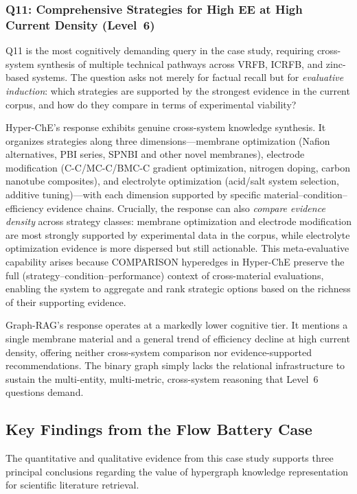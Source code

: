 \documentclass[11pt,a4paper]{article}
\begin{document}
\subsubsection{Q11: Comprehensive Strategies for High EE at High Current Density (Level~6)}

Q11 is the most cognitively demanding query in the case study, requiring cross-system synthesis of multiple technical pathways across VRFB, ICRFB, and zinc-based systems. The question asks not merely for factual recall but for \emph{evaluative induction}: which strategies are supported by the strongest evidence in the current corpus, and how do they compare in terms of experimental viability?

Hyper-ChE's response exhibits genuine cross-system knowledge synthesis. It organizes strategies along three dimensions---membrane optimization (Nafion alternatives, PBI series, SPNBI and other novel membranes), electrode modification (C-C/MC-C/BMC-C gradient optimization, nitrogen doping, carbon nanotube composites), and electrolyte optimization (acid/salt system selection, additive tuning)---with each dimension supported by specific material--condition--efficiency evidence chains. Crucially, the response can also \emph{compare evidence density} across strategy classes: membrane optimization and electrode modification are most strongly supported by experimental data in the corpus, while electrolyte optimization evidence is more dispersed but still actionable. This meta-evaluative capability arises because COMPARISON hyperedges in Hyper-ChE preserve the full (strategy--condition--performance) context of cross-material evaluations, enabling the system to aggregate and rank strategic options based on the richness of their supporting evidence.

Graph-RAG's response operates at a markedly lower cognitive tier. It mentions a single membrane material and a general trend of efficiency decline at high current density, offering neither cross-system comparison nor evidence-supported recommendations. The binary graph simply lacks the relational infrastructure to sustain the multi-entity, multi-metric, cross-system reasoning that Level~6 questions demand.

\subsection{Key Findings from the Flow Battery Case}
\label{subsec:flow_battery_findings}

The quantitative and qualitative evidence from this case study supports three principal conclusions regarding the value of hypergraph knowledge representation for scientific literature retrieval.
\end{document}

